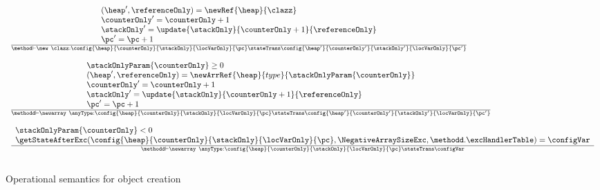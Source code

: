  
\begin{figure}[ht!] 
\begin{frameit}
 $$ \begin{array}{l}

\frac{\begin{array}{l}
			(\heap',\referenceOnly) = \newRef{\heap}{\clazz} \\ 
			\counterOnly' = \counterOnly + 1\\
			\stackOnly' = \update{\stackOnly}{\counterOnly +  1}{ \referenceOnly  } \\
			\pc' = \pc + 1
	          \end{array}}
              {\method \vdash \new \ \clazz :  \config{\heap}{\counterOnly}{\stackOnly}{\locVarOnly}{\pc} 
		               \stateTrans  
			       \config{\heap'}
			              {\counterOnly'}
				      {\stackOnly' }
				      {\locVarOnly}
				      {\pc'}  } %
\\ \\ 


\frac{\begin{array}{l}
		               \stackOnlyParam{\counterOnly} \geq 0  \\
			                    (\heap',\referenceOnly ) = \newArrRef{\heap}{type}{\stackOnlyParam{\counterOnly}}\\
					    \counterOnly' = \counterOnly + 1\\
					    \stackOnly' = \update{\stackOnly}{\counterOnly +  1}{\referenceOnly } \\
					    \pc' = \pc + 1
			       \end{array}  }
                {\methodd \vdash  \newarray \ \anyType :  \config{\heap}{\counterOnly}{\stackOnly}{\locVarOnly}{\pc} 
		               \stateTrans  
			       \config{\heap'}
			              {\counterOnly'}
				      {\stackOnly' }
				      {\locVarOnly}
				      {\pc'}  } %
\\ \\
\frac{\begin{array}{l}
		               \stackOnlyParam{\counterOnly} < 0 \\
			       \getStateAfterExc( \config{\heap}{\counterOnly}{\stackOnly}{\locVarOnly}{\pc}, \NegativeArraySizeExc,\methodd.\excHandlerTable ) =  \configVar                	        \end{array}  }
                {\methodd \vdash  \newarray \ \anyType :  \config{\heap}{\counterOnly}{\stackOnly}{\locVarOnly}{\pc} 
			                      \stateTrans  
					      \configVar } %
 \\ \\
\end{array}$$
\caption{\sc Operational semantics for object creation }
\label{opSem:obj:creat}
\end{frameit}
\end{figure}

